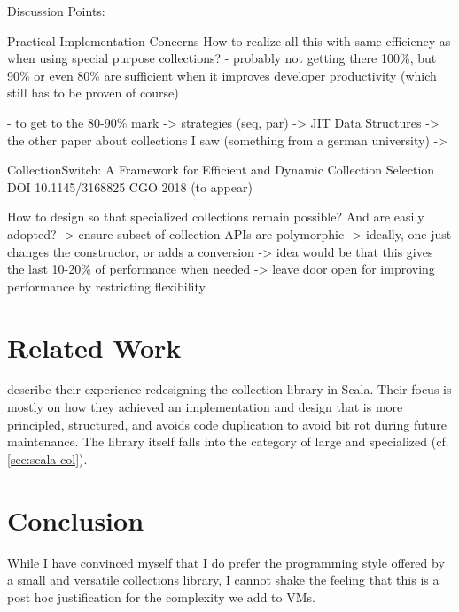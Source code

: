 \documentclass[sigconf, 10pt]{acmart}
\begin{document}
\begin{note}
Discussion Points:
 


Practical Implementation Concerns
 How to realize all this with same efficiency as when using special purpose
 collections?
 - probably not getting there 100\%, but 90\% or even 80\% are sufficient
   when it improves developer productivity (which still has to be proven of course)
  
 - to get to the 80-90\% mark
  -> strategies (seq, par)
  -> JIT Data Structures
     -> the other paper about collections I saw (something from a german university)
  ->

CollectionSwitch: A Framework for Efficient and Dynamic Collection Selection
DOI 10.1145/3168825
CGO 2018 (to appear)



How to design so that specialized collections remain possible?
And are easily adopted?
 -> ensure subset of collection APIs are polymorphic
   -> ideally, one just changes the constructor, or adds a conversion
   -> idea would be that this gives the last 10-20\% of performance when needed
   -> leave door open for improving performance by restricting flexibility
\end{note}




\section{Related Work}

\citet{Odersky:2009} describe their experience
redesigning the collection library in Scala.
Their focus is mostly on how they achieved an implementation and design
that is more principled, structured, and avoids code duplication
to avoid bit rot during future maintenance.
The library itself falls into the category of large and specialized (cf. \cref{sec:scala-col}). 

\section{Conclusion}



While I have convinced myself
that I do prefer the programming style offered
by a small and versatile collections library,
I cannot shake the feeling
that this is a post hoc justification
for the complexity we add to VMs.
\end{document}
